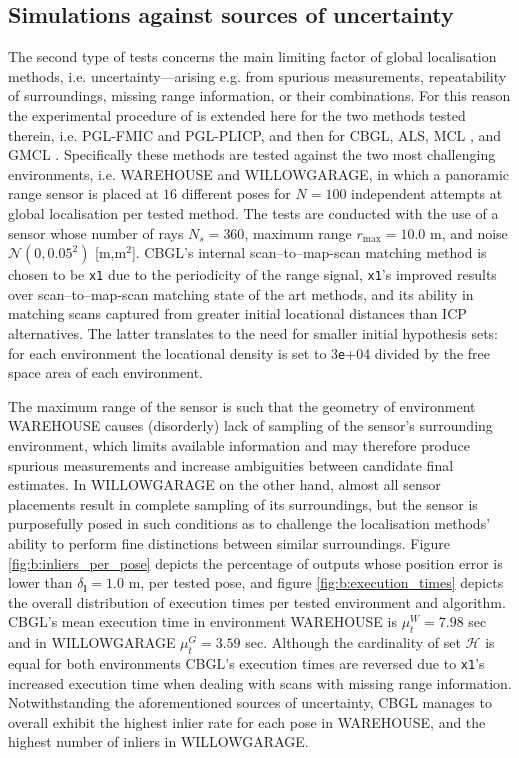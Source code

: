 \subsection{Simulations against sources of uncertainty}

The second type of tests concerns the main limiting factor of global
localisation methods, i.e. uncertainty---arising e.g. from spurious
measurements, repeatability of surroundings, missing range information, or
their combinations. For this reason the experimental procedure of
\cite{Filotheou2022g} is extended here for the two methods tested therein,
i.e. PGL-FMIC and PGL-PLICP, and then for CBGL, ALS, MCL \cite{mcl}, and GMCL
\cite{gmcl}.  Specifically these methods are tested against the two most
challenging environments, i.e. WAREHOUSE and WILLOWGARAGE, in which a panoramic
range sensor is placed at $16$ different poses for $N = 100$ independent
attempts at global localisation per tested method. The tests are conducted with
the use of a sensor whose number of rays $N_s = 360$, maximum range
$r_{\max} = 10.0$ m, and noise $\mathcal{N}(0, 0.05^2)$ [m,m$^2$]. CBGL's
internal scan--to--map-scan matching method is chosen to be \texttt{x1}
\cite{Filotheou2023a} due to the periodicity of the range signal,
\texttt{x1}'s improved results over scan--to--map-scan matching state of the
art methods, and its ability in matching scans captured from greater initial
locational distances than ICP alternatives. The latter translates to the need
for smaller initial hypothesis sets: for each environment the locational
density is set to $3$\texttt{e}+04 divided by the free space area of each
environment.

The maximum range of the sensor is such that the geometry of environment
WAREHOUSE causes (disorderly) lack of sampling of the sensor's surrounding
environment, which limits available information and may therefore produce
spurious measurements and increase ambiguities between candidate final
estimates. In WILLOWGARAGE on the other hand, almost all sensor placements
result in complete sampling of its surroundings, but the sensor is purposefully
posed in such conditions as to challenge the localisation methods' ability to
perform fine distinctions between similar surroundings. Figure
\ref{fig:b:inliers_per_pose} depicts the percentage of outputs whose position
error is lower than $\delta_{\bm{l}} = 1.0$ m, per tested pose, and figure
\ref{fig:b:execution_times} depicts the overall distribution of execution times
per tested environment and algorithm. CBGL's mean execution time in environment
WAREHOUSE is $\mu_t^W = 7.98$ sec and in WILLOWGARAGE $\mu_t^{G} = 3.59$ sec.
Although the cardinality of set $\mathcal{H}$ is equal for both environments
CBGL's execution times are reversed due to \texttt{x1}'s increased execution
time when dealing with scans with missing range information. Notwithstanding
the aforementioned sources of uncertainty, CBGL manages to overall exhibit the
highest inlier rate for each pose in WAREHOUSE, and the highest number of
inliers in WILLOWGARAGE.



